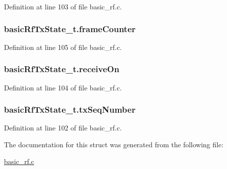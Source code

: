Definition at line 103 of file basic\_\-rf.c.

\hypertarget{structbasic_rf_tx_state__t_aaa2d41a209294093ad7c03b13c71df50}{
\subsubsection[{frameCounter}]{ {\bf basicRfTxState\_\-t.frameCounter}}}
\label{structbasic_rf_tx_state__t_aaa2d41a209294093ad7c03b13c71df50}


Definition at line 105 of file basic\_\-rf.c.

\hypertarget{structbasic_rf_tx_state__t_ae9ea1758c5ff0649f4dacecbc6526ded}{
\subsubsection[{receiveOn}]{ {\bf basicRfTxState\_\-t.receiveOn}}}
\label{structbasic_rf_tx_state__t_ae9ea1758c5ff0649f4dacecbc6526ded}


Definition at line 104 of file basic\_\-rf.c.

\hypertarget{structbasic_rf_tx_state__t_afeacb6ece372c19b18198fda274b3bdb}{
\subsubsection[{txSeqNumber}]{ {\bf basicRfTxState\_\-t.txSeqNumber}}}
\label{structbasic_rf_tx_state__t_afeacb6ece372c19b18198fda274b3bdb}


Definition at line 102 of file basic\_\-rf.c.



The documentation for this struct was generated from the following file:\begin{DoxyCompactItemize}
\item 
\hyperlink{basic__rf_8c}{basic\_\-rf.c}\end{DoxyCompactItemize}

